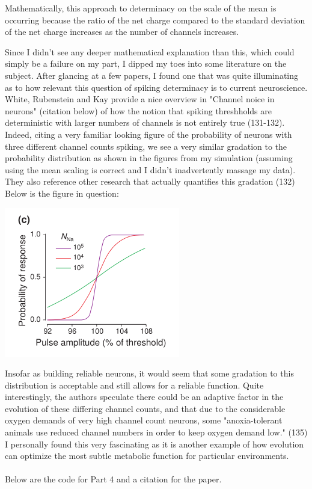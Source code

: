 \documentclass{article}
\begin{document}
Mathematically, this approach to determinacy on the scale of the mean is occurring because the ratio of the net charge compared to the standard deviation of the net charge increases as the number of channels increases.

Since I didn't see any deeper mathematical explanation than this, which could simply be a failure on my part, I dipped my toes into some literature on the subject. After glancing at a few papers, I found one that was quite illuminating as to how relevant this question of spiking determinacy is to current neuroscience. White, Rubenstein and Kay provide a nice overview in "Channel noice in neurons" (citation below) of how the notion that spiking threshholds are deterministic with larger numbers of channels is not entirely true (131-132). Indeed, citing a very familiar looking figure of the probability of neurons with three different channel counts spiking, we see a very similar gradation to the probability distribution as shown in the figures from my simulation (assuming using the mean scaling is correct and I didn't inadvertently massage my data). They also reference other research that actually quantifies this gradation (132) Below is the figure in question:
\begin{center}
    \includegraphics[scale = 1]{paper_figure.png}
\end{center}

Insofar as building reliable neurons, it would seem that some gradation to this distribution is acceptable and still allows for a reliable function. Quite interestingly, the authors speculate there could be an adaptive factor in the evolution of these differing channel counts, and that due to the considerable oxygen demands of very high channel count neurons, some "anoxia-tolerant animals use reduced channel numbers in order to keep oxygen demand low." (135) I personally found this very fascinating as it is another example of how evolution can optimize the most subtle metabolic function for particular environments.\\
\\
Below are the code for Part 4 and a citation for the paper.
\end{document}
